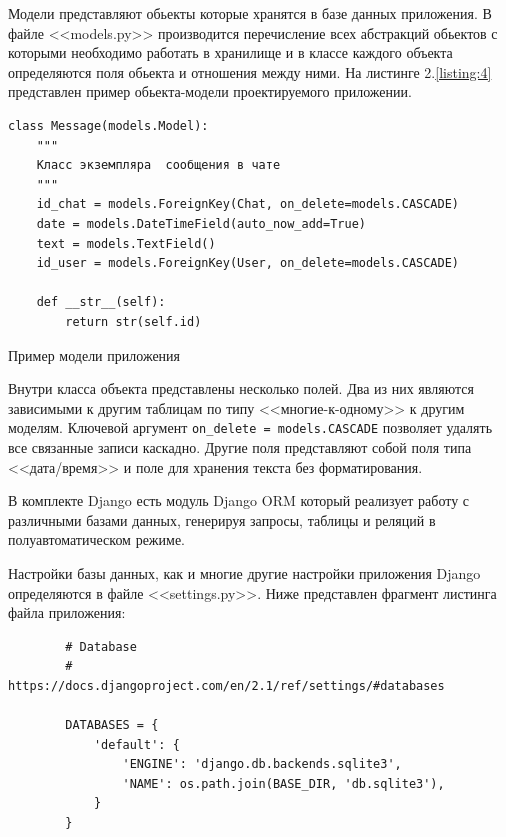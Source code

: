 Модели представляют обьекты которые хранятся в базе данных приложения. В файле <<models.py>> производится перечисление всех абстракций обьектов с которыми необходимо работать в хранилище и в классе каждого объекта определяются поля обьекта и отношения между ними. На листинге 2.\ref{listing:4} представлен пример обьекта-модели проектируемого приложении. 

\begin{listing}[H]
\begin{verbatim}
class Message(models.Model):
    """
    Класс экземпляра  сообщения в чате
    """
    id_chat = models.ForeignKey(Chat, on_delete=models.CASCADE)
    date = models.DateTimeField(auto_now_add=True)
    text = models.TextField()
    id_user = models.ForeignKey(User, on_delete=models.CASCADE)

    def __str__(self):
        return str(self.id)

\end{verbatim}
\caption{Пример модели приложения}
\label{listing:4}
\end{listing}

Внутри класса объекта представлены несколько полей. Два из них являются зависимыми к другим таблицам по типу <<многие-к-одному>> к другим моделям. Ключевой аргумент \texttt{on_delete = models.CASCADE} позволяет удалять все связанные записи каскадно. Другие поля представляют собой поля типа <<дата/время>> и поле для хранения текста без форматирования. 

В комплекте Django есть модуль Django ORM который реализует работу с различными базами данных, генерируя запросы, таблицы и реляций в полуавтоматическом режиме. 

Настройки базы данных, как и многие другие настройки приложения Django определяются в файле <<settings.py>>. Ниже представлен фрагмент листинга файла приложения: 

\begin{minipage}{0.9\textwidth}
        \begin{verbatim}
        # Database
        # https://docs.djangoproject.com/en/2.1/ref/settings/#databases
        
        DATABASES = {
            'default': {
                'ENGINE': 'django.db.backends.sqlite3',
                'NAME': os.path.join(BASE_DIR, 'db.sqlite3'),
            }
        }
        \end{verbatim}
\end{minipage}\\[1.5pt]

